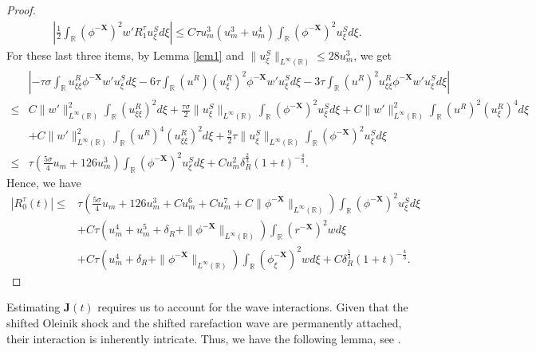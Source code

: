 \documentclass[10pt,reqno]{amsart}
\numberwithin{equation}{section}
\begin{document}
\begin{proof}
\begin{align*}
			\left|\frac{1}{2}\int_{\mathbb{R}}(\phi^{-\mathbf{X}})^{2}w'R_{1}^{\tau}u_{\xi}^{S}d\xi\right|\leq C\tau u_m^3\left(u_m^3+u_m^4\right)\int_{\mathbb{R}}(\phi^{-\mathbf{X}})^2u^S_{\xi}d\xi.
		\end{align*}
		For these last three items, by Lemma \ref{lem1} and $\|u^S_{\xi}\|_{L^{\infty}(\mathbb{R})}\leq 28u_m^3$, we get
		\begin{align*}
			&\left|-\tau\sigma\int_{\mathbb{R}}u_{\xi\xi}^R\phi^{-\mathbf{X}}w'u_{\xi}^Sd\xi-6\tau\int_{\mathbb{R}}(u^{R})(u_{\xi}^{R})^{2}\phi^{-\mathbf{X}}w'u_{\xi}^{S}d\xi-3\tau\int_{\mathbb{R}}(u^{R})^{2}u_{\xi\xi}^{R}\phi^{-\mathbf{X}}w'u_{\xi}^{S}d\xi\right|\\
			\leq&C \|w'\|_{L^{\infty}(\mathbb{R})}^2\int_{\mathbb{R}}(u^R_{\xi\xi})^2d\xi+\frac{\tau\sigma}{2} \|u^{S}_{\xi}\|_{L^{\infty}(\mathbb{R})}\int_{\mathbb{R}}(\phi^{-\mathbf{X}})^2u^S_{\xi}d\xi+C\|w'\|_{L^{\infty}(\mathbb{R})}^2\int_{\mathbb{R}}(u^{R})^2(u^R_{\xi})^{4}d\xi\\
			&+C\|w'\|_{L^{\infty}(\mathbb{R})}^2\int_{\mathbb{R}}(u^R)^4(u^R_{\xi\xi})^2d\xi+\frac{9}{2}\tau \|u^S_{\xi}\|_{L^{\infty}(\mathbb{R})}\int_{\mathbb{R}}(\phi^{-\mathbf{X}})^2u^S_{\xi}d\xi\\
			\leq&\tau\left(\frac{5\sigma}{4}u_m+126u_m^3\right)\int_{\mathbb{R}}(\phi^{-\mathbf{X}})^2u^S_{\xi}d\xi+Cu_m^2\delta_R^{\frac{2}{3}}(1+t)^{-\frac{4}{3}}.
		\end{align*}
		Hence, we have
		\begin{equation}\label{N15}
			\begin{aligned}
				\left|R_0^{\tau}(t)\right|
				\leq&\tau(\frac{5\sigma}{4}u_m+126u_m^3+C u_m^{6}+Cu_m^7+C\|\phi^{-\mathbf{X}}\|_{L^{\infty}(\mathbb{R})})\int_{\mathbb{R}}(\phi^{-\mathbf{X}})^2u_{\xi}^Sd\xi\\
				&+C\tau\left(u_m^4+ u_m^5+\delta_R+\|\phi^{-\mathbf{X}}\|_{L^{\infty}(\mathbb{R})}\right)\int_{\mathbb{R}}(r^{-\mathbf{X}})^2wd\xi\\
				&+C\tau\left(u_m^4+\delta_R+\|\phi^{-\mathbf{X}}\|_{L^{\infty}(\mathbb{R})}\right)\int_{\mathbb{R}}(\phi_{\xi}^{-\mathbf{X}})^2wd\xi+C\delta_R^{\frac{1}{3}}(1+t)^{-\frac{4}{3}}.
			\end{aligned}
		\end{equation}
	\end{proof}
	Estimating $\mathbf{J}(t)$ requires us to account for the wave interactions. Given that the shifted Oleinik shock and the shifted rarefaction wave are permanently attached, their interaction is inherently intricate. Thus, we have the following lemma, see \cite{ref16}.
\end{document}
